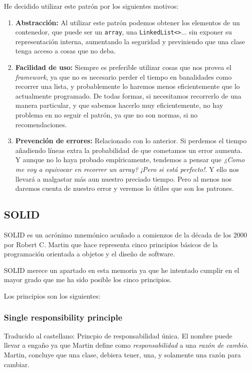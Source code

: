 He decidido utilizar este patr\'{o}n por los siguientes motivos:
\begin{enumerate}
    \item \textbf{Abstracci\'{o}n:}
    Al utilizar este patr\'{o}n podemos obtener los elementos de un contenedor, que puede ser un \texttt{array}, una \texttt{LinkedList<>}... sin
    exponer su representaci\'{o}n interna, aumentando la seguridad y previniendo que una clase tenga acceso a cosas que no deba.
    
    \item \textbf{Facilidad de uso:}
    Siempre es preferible utilizar cosas que nos provea el \emph{framework}, ya que no es necesario perder el tiempo en banalidades como 
    recorrer una lista, y probablemente lo haremos menos eficientemente que lo actualmente programado. De todas formas, si necesitamos
    recorrerlo de una manera particular, y que sabemos hacerlo muy eficientemente, no hay problema en no seguir el patr\'{o}n, ya que no son
    normas, si no recomendaciones.
    
    \item \textbf{Prevenci\'{o}n de errores:}
    Relacionado con lo anterior. Si perdemos el tiempo a\~{n}adiendo l\'{i}neas extra la probabilidad de que cometamos un error aumenta. Y aunque
    no lo haya probado emp\'{i}ricamente, tendemos a pensar que \emph{¿Como me voy a equivocar en recorrer un array? ¡Pero si est\'{a} perfecto!}. 
    Y ello nos llevar\'{a} a malgastar m\'{a}s aun nuestro preciado tiempo. Pero al menos nos daremos cuenta de nuestro error y veremos lo
    \'{u}tiles que son los patrones.
\end{enumerate}

\subsection{SOLID}
SOLID es un acr\'{o}nimo mnem\'{o}nico acu\~{n}ado a comienzos de la d\'{e}cada de los 2000 por Robert C. Martin \cite{bringhurst:elements} 
que hace representa cinco principios b\'{a}sicos de la programaci\'{o}n orientada a objetos y el dise\~{n}o de software.

SOLID merece un apartado en esta memoria ya que he intentado cumplir en el mayor grado que me ha sido posible los cinco principios.

Los principios son los siguientes:
\subsubsection{Single responsibility principle}
Traducido al castellano: Princpio de responsabilidad \'{u}nica. El nombre puede llevar a enga\~{n}o ya que Martin define como \emph{responsabilidad}
a una \emph{raz\'{o}n de cambio}. Martin, concluye que una clase, debiera tener, una, y solamente una raz\'{o}n para cambiar.

